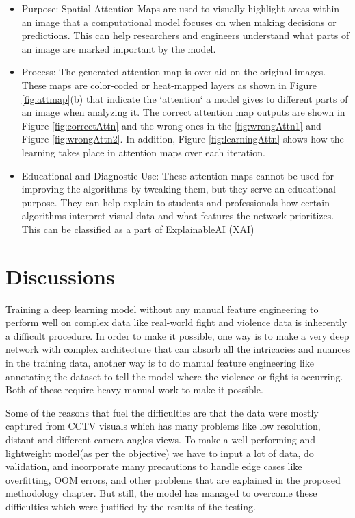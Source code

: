 \begin{itemize}
    \item Purpose: Spatial Attention Maps are used to visually highlight areas within an image that a computational model focuses on when making decisions or predictions. This can help researchers and engineers understand what parts of an image are marked important by the model.

    \item Process: The generated attention map is overlaid on the original images. These maps are color-coded or heat-mapped layers as shown in Figure \ref{fig:attmap}(b) that indicate the `attention` a model gives to different parts of an image when analyzing it. The correct attention map outputs are shown in Figure \ref{fig:correctAttn} and the wrong ones in the \ref{fig:wrongAttn1} and Figure \ref{fig:wrongAttn2}. In addition, Figure \ref{fig:learningAttn} shows how the learning takes place in attention maps over each iteration.

    \item Educational and Diagnostic Use: These attention maps cannot be used for improving the algorithms by tweaking them, but they serve an educational purpose. They can help explain to students and professionals how certain algorithms interpret visual data and what features the network prioritizes. This can be classified as a part of ExplainableAI (XAI)
    
\end{itemize}

\clearpage

\section{Discussions}

\noindent Training a deep learning model without any manual feature engineering to perform well on complex data like real-world fight and violence data is inherently a difficult procedure. In order to make it possible, one way is to make a very deep network with complex architecture that can absorb all the intricacies and nuances in the training data, another way is to do manual feature engineering like annotating the dataset to tell the model where the violence or fight is occurring. Both of these require heavy manual work to make it possible.

\noindent Some of the reasons that fuel the difficulties are that the data were mostly captured from CCTV visuals which has many problems like low resolution, distant and different camera angles views. To make a well-performing and lightweight model(as per the objective) we have to input a lot of data, do validation, and incorporate many precautions to handle edge cases like overfitting, OOM errors, and other problems that are explained in the proposed methodology chapter. But still, the model has managed to overcome these difficulties which were justified by the results of the testing.

